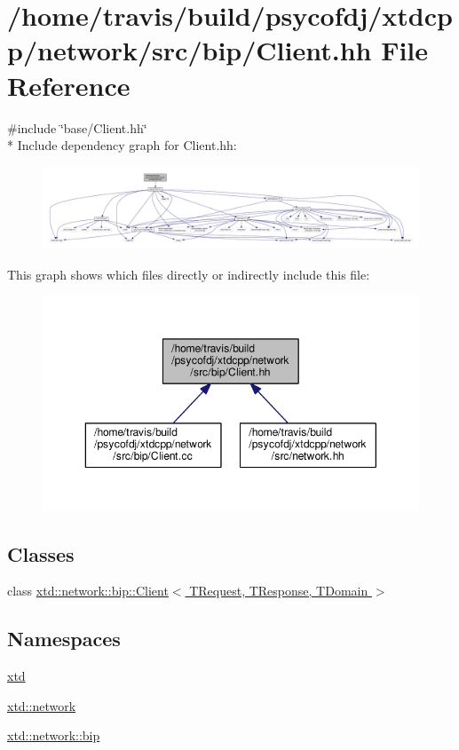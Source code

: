 \hypertarget{bip_2Client_8hh}{\section{/home/travis/build/psycofdj/xtdcpp/network/src/bip/\-Client.hh File Reference}
\label{bip_2Client_8hh}
}
{\ttfamily \#include \char`\"{}base/\-Client.\-hh\char`\"{}}\\*
Include dependency graph for Client.\-hh\-:
\nopagebreak
\begin{figure}[H]
\begin{center}
\leavevmode
\includegraphics[width=350pt]{bip_2Client_8hh__incl}
\end{center}
\end{figure}
This graph shows which files directly or indirectly include this file\-:
\nopagebreak
\begin{figure}[H]
\begin{center}
\leavevmode
\includegraphics[width=350pt]{bip_2Client_8hh__dep__incl}
\end{center}
\end{figure}
\subsection*{Classes}
\begin{DoxyCompactItemize}
\item 
class \hyperlink{classxtd_1_1network_1_1bip_1_1Client}{xtd\-::network\-::bip\-::\-Client$<$ T\-Request, T\-Response, T\-Domain $>$}
\end{DoxyCompactItemize}
\subsection*{Namespaces}
\begin{DoxyCompactItemize}
\item 
\hyperlink{namespacextd}{xtd}
\item 
\hyperlink{namespacextd_1_1network}{xtd\-::network}
\item 
\hyperlink{namespacextd_1_1network_1_1bip}{xtd\-::network\-::bip}
\end{DoxyCompactItemize}
